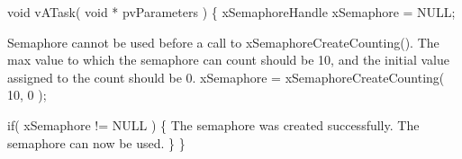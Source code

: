 \begin{DoxyPre} void vATask( void * pvParameters )
 \{
 xSemaphoreHandle xSemaphore = NULL;\end{DoxyPre}



\begin{DoxyPre}Semaphore cannot be used before a call to xSemaphoreCreateCounting().
The max value to which the semaphore can count should be 10, and the
initial value assigned to the count should be 0.
    xSemaphore = xSemaphoreCreateCounting( 10, 0 );\end{DoxyPre}



\begin{DoxyPre}    if( xSemaphore != NULL )
    \{
The semaphore was created successfully.
The semaphore can now be used.  
    \}
 \}
 \end{DoxyPre}
 